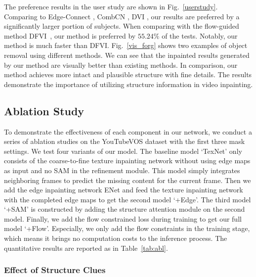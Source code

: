 The preference results in the user study are shown in Fig.~\ref{userstudy}. 
Comparing to Edge-Connect \cite{nazeri2019edgeconnect}, CombCN \cite{wang2019video}, DVI \cite{Kim_2019_CVPR1}, our results are preferred by a significantly larger portion of subjects.
%
When comparing with the flow-guided method DFVI~\cite{Xu_2019_CVPR}, our method is preferred by $55.24\%$ of the tests. 
Notably, our method is much faster than DFVI.
%
Fig.~\ref{vis_forg} shows two examples of object removal using different methods. 
We can see that the inpainted results generated by our method are visually better than existing methods.
In comparison, our method achieves more intact and plausible structure with fine details.
The results demonstrate the importance of utilizing structure information in video inpainting. 




\subsection{Ablation Study}
To demonstrate the effectiveness of each component in our network, we conduct a series of ablation studies on the YouTubeVOS dataset with the first three mask settings. 
%
We test four variants of our model. 
The baseline model `TexNet' only consists of the coarse-to-fine texture inpainting network without using edge maps as input and no SAM in the refinement module.
This model simply integrates neighboring frames to predict the missing content for the current frame.
%
Then we add the edge inpainting network ENet and feed the texture inpainting network with the completed edge maps to get the second model `+Edge'.
The third model `+SAM' is constructed by adding the structure attention module on the second model. 
Finally, we add the flow constrained loss during training to get our full model `+Flow'. Especially, we only add the flow constraints in the training stage, which means it brings no computation costs to the inference process.
The quantitative results are reported as in Table~\ref{tab:abl}. 

%

\subsubsection{Effect of Structure Clues}


